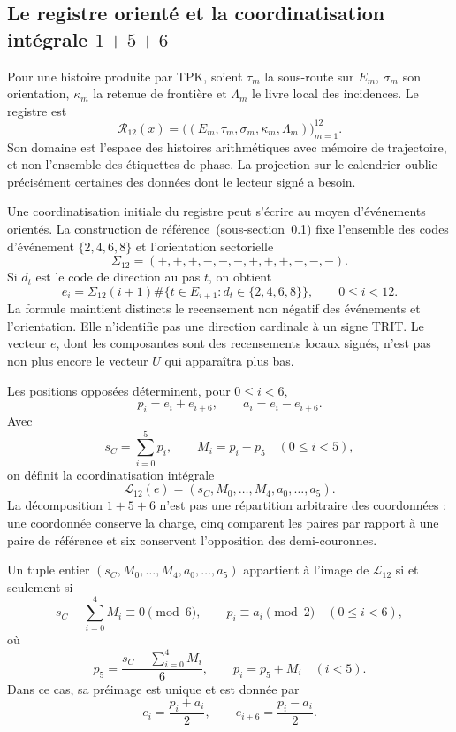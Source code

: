 \subsection{Le registre orienté et la coordinatisation intégrale \texorpdfstring{\(1+5+6\)}{1+5+6}}
\label{subsec:k-registro-integral}

Pour une histoire produite par TPK, soient \(\tau_m\) la sous-route sur
\(E_m\), \(\sigma_m\) son orientation, \(\kappa_m\) la retenue de
frontière et \(\Lambda_m\) le livre local des incidences. Le registre est
\[
 \mathcal R_{12}(x)=
 \bigl((E_m,\tau_m,\sigma_m,\kappa_m,\Lambda_m)\bigr)_{m=1}^{12}.
\]
Son domaine est l'espace des histoires arithmétiques avec mémoire de trajectoire, et non l'ensemble des
étiquettes de phase. La projection sur le calendrier oublie précisément certaines
des données dont le lecteur signé a besoin.

Une coordinatisation initiale du registre peut s’écrire au moyen d’événements
orientés. La construction de référence~(sous-section~\ref{subsec:k-registro-integral}) fixe l’ensemble des codes d’événement
\(\{2,4,6,8\}\) et l’orientation sectorielle
\[
 \Sigma_{12}=(+,+,+,-,-,-,+,+,+,-,-,-).
\]
Si \(d_t\) est le code de direction au pas \(t\), on obtient
\[
 e_i=\Sigma_{12}(i+1)
 \#\{t\in E_{i+1}:d_t\in\{2,4,6,8\}\},
 \qquad0\leq i<12.
\]
La formule maintient distincts le recensement non négatif des événements et
l'orientation. Elle n'identifie pas une direction cardinale à un signe TRIT. Le
vecteur \(e\), dont les composantes sont des recensements locaux signés, n'est pas non plus
encore le vecteur \(U\) qui apparaîtra plus bas.

Les positions opposées déterminent, pour \(0\leq i<6\),
\[
 p_i=e_i+e_{i+6},\qquad a_i=e_i-e_{i+6}.
\]
Avec
\[
 s_C=\sum_{i=0}^{5}p_i,\qquad M_i=p_i-p_5\quad(0\leq i<5),
\]
on définit la coordinatisation intégrale
\[
 \mathcal L_{12}(e)
 =(s_C,M_0,\ldots,M_4,a_0,\ldots,a_5).
\]
La décomposition \(1+5+6\) n'est pas une répartition arbitraire des coordonnées :
une coordonnée conserve la charge, cinq comparent les paires par rapport à une
paire de référence et six conservent l'opposition des demi-couronnes.

\begin{lemma}
\label{lem:k-carta-integral}
Un tuple entier \((s_C,M_0,\ldots,M_4,a_0,\ldots,a_5)\) appartient à l'image de \(\mathcal L_{12}\) si et seulement si
\[
 s_C-\sum_{i=0}^{4}M_i\equiv0\pmod6,
 \qquad p_i\equiv a_i\pmod2\quad(0\leq i<6),
\]
où
\[
 p_5=\frac{s_C-\sum_{i=0}^{4}M_i}{6},\qquad p_i=p_5+M_i\quad(i<5).
\]
Dans ce cas, sa préimage est unique et est donnée par
\[
 e_i=\frac{p_i+a_i}{2},\qquad e_{i+6}=\frac{p_i-a_i}{2}.
\]
\end{lemma}

